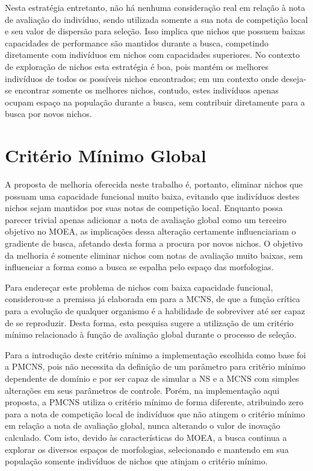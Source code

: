 Nesta estratégia entretanto, não há nenhuma consideração real em relação à nota de avaliação do indivíduo, sendo utilizada somente a sua nota de competição local e seu valor de dispersão para seleção. Isso implica que nichos que possuem baixas capacidades de performance são mantidos durante a busca, competindo diretamente com indivíduos em nichos com capacidades superiores. No contexto de exploração de nichos esta estratégia é boa, pois mantém os melhores indivíduos de todos os possíveis nichos encontrados; em um contexto onde deseja-se encontrar somente os melhores nichos, contudo, estes indivíduos apenas ocupam espaço na população durante a busca, sem contribuir diretamente para a busca por novos nichos.

\section{Critério Mínimo Global}
\label{dev_criterio_minimo}

A proposta de melhoria oferecida neste trabalho é, portanto, eliminar nichos que possuam uma capacidade funcional muito baixa, evitando que indivíduos destes nichos sejam mantidos por suas notas de competição local. Enquanto possa parecer trivial apenas adicionar a nota de avaliação global como um terceiro objetivo no MOEA, as implicações dessa alteração certamente influenciariam o gradiente de busca, afetando desta forma a procura por novos nichos. O objetivo da melhoria é somente eliminar nichos com notas de avaliação muito baixas, sem influenciar a forma como a busca se espalha pelo espaço das morfologias.

Para endereçar este problema de nichos com baixa capacidade funcional, con\-si\-de\-rou-se a premissa já elaborada em \cite{lehman2010revising} para a MCNS, de que a função crítica para a evolução de qualquer organismo é a habilidade de sobreviver até ser capaz de se reproduzir. Desta forma, esta pesquisa sugere a utilização de um critério mínimo relacionado à função de avaliação global durante o processo de seleção.

Para a introdução deste critério mínimo a implementação escolhida como base foi a PMCNS, pois não necessita da definição de um parâmetro para critério mínimo dependente de domínio e por ser capaz de simular a NS e a MCNS com simples alterações em seus parâmetros de controle. Porém, na implementação aqui proposta, a PMCNS utiliza o critério mínimo de forma diferente, atribuindo zero para a nota de competição local de indivíduos que não atingem o critério mínimo em relação a nota de avaliação global, nunca alterando o valor de inovação calculado. Com isto, devido às características do MOEA, a busca continua a explorar os diversos espaços de morfologias, selecionando e mantendo em sua população somente indivíduos de nichos que atinjam o critério mínimo.

